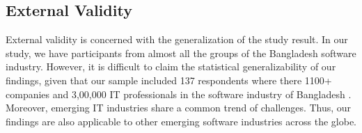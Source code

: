 \subsection{External Validity}
External validity is concerned with the generalization of the study result. In our study, we have participants from almost all the groups of the Bangladesh software industry. However, it is difficult to claim the statistical generalizability of our findings, given that our sample included 137 respondents where there 1100+ companies and 3,00,000 IT professionals\cite{BASIS2018} in the software industry of Bangladesh . Moreover, emerging IT industries share a common trend of challenges\cite{Sison2006, lloyd2020}. Thus, our findings are also applicable to other emerging software industries across the globe.